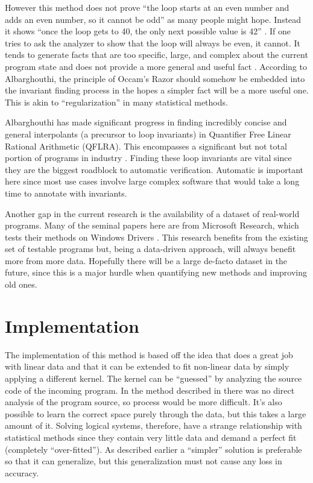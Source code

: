 \documentclass[letterpaper,twocolumn,10pt]{article}
\begin{document}
However this method does not prove ``the loop starts at an even number and adds
an even number, so it cannot be odd'' as many people might hope.
Instead it shows ``once the loop gets to 40, the only next possible value is
42'' \cite{solving-horn-inter}.
If one tries to ask the analyzer to show that the loop will always be even,
it cannot. It tends to generate facts that are too specific, large, and complex
about the current program state and does not provide a more general and useful fact​
\cite{beautiful-interpolants} \cite{interpolant-strength}.
According to Albarghouthi, the principle of Occam’s Razor should somehow be
embedded into the invariant finding process in the hopes a simpler fact will be
a more useful one. This is akin to ``regularization'' in many statistical methods.

Albarghouthi has made significant progress in finding incredibly concise and
general interpolants (a precursor to loop invariants) in Quantifier Free Linear
Rational Arithmetic (QFLRA). This encompasses a significant but not total
portion of programs in industry \cite{beautiful-interpolants}. Finding these
loop invariants are vital since they are the biggest roadblock to automatic
verification. Automatic is important here since most use cases involve large
complex software that would take a long time to annotate with invariants.

Another gap in the current research is the availability of a dataset of real-world
programs. Many of the seminal papers here are from Microsoft Research, which tests
their methods on Windows Drivers ​\cite{do-good}.
This research benefits from the existing set of testable programs but, being a
data-driven approach, will always benefit more from more data.
Hopefully there will be a large de-facto dataset in the future, since this is a
major hurdle when quantifying new methods and improving old ones.

\section{Implementation}

The implementation of this method is based off the idea that \cite{data-driven}
does a great job with linear data and that it can be extended to fit non-linear
data by simply applying a different kernel. The kernel can be ``guessed'' by
analyzing the source code of the incoming program. In the method described in
\cite{data-driven} there was no direct analysis of the program source, so
process would be more difficult. It's also possible to learn the correct space
purely through the data, but this takes a large amount of it.
Solving logical systems, therefore, have a strange relationship with statistical
methods since they contain very little data and demand a perfect fit (completely
``over-fitted''). As described earlier a ``simpler'' solution is preferable so
that it can generalize, but this generalization must not cause any loss in
accuracy.
\end{document}
